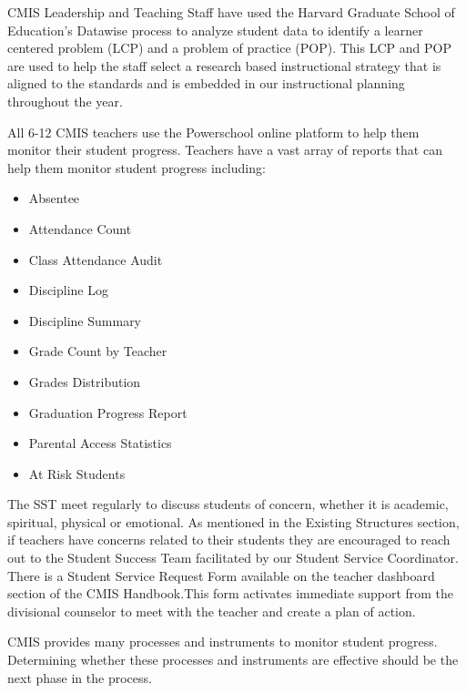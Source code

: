 \begin{findings}

CMIS Leadership and Teaching Staff have used the Harvard Graduate School of Education’s Datawise process to analyze student data to identify a learner centered problem (LCP) and a problem of practice (POP). This LCP and POP are used to help the staff select a research based instructional strategy that is aligned to the standards and is embedded in our instructional planning  throughout the year. 

 
All 6-12 CMIS teachers use the Powerschool online platform to help them monitor their student progress. Teachers have a vast array of reports that can help them monitor student progress including: 

\begin{itemize}
\item Absentee	
\item Attendance Count	
\item Class Attendance Audit
\item Discipline Log	
\item Discipline Summary
\item Grade Count by Teacher	
\item Grades Distribution	
\item Graduation Progress Report 
\item Parental Access Statistics
\item At Risk Students	
\end{itemize}


The SST meet regularly to discuss students of concern, whether it is academic, spiritual, physical or emotional. As mentioned in the Existing Structures section, if teachers have concerns related to their students they are encouraged to reach out to the Student Success Team facilitated by our Student Service Coordinator. There is a Student Service Request Form available on the teacher dashboard section of the CMIS Handbook.This form activates immediate support from the divisional counselor to meet with the teacher and create a plan of action.


CMIS provides many processes and instruments to monitor student progress. Determining whether these processes and instruments are effective should be the next phase in the process. 
\end{findings}

